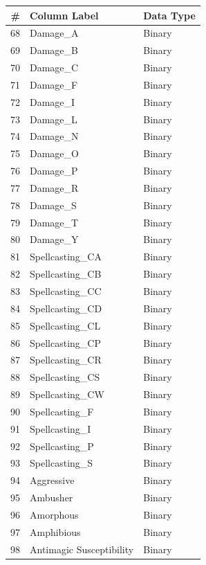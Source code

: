 \documentclass{article}
\begin{document}
\begin{table}[ht]
\begin{tiny}
\begin{minipage}[b]{0.45\linewidth}
\begin{tabular}{@{}rll@{}}
	\bottomrule
\end{tabular}
\end{minipage}
\hspace{0.5cm}
\begin{minipage}[b]{0.45\linewidth}\centering
\begin{tabular}{@{}rll@{}}
	\toprule
	\# & Column Label & Data Type \\
	\midrule
	68 & Damage\_A & Binary \\
	69 & Damage\_B & Binary \\
	70 & Damage\_C & Binary \\
	71 & Damage\_F & Binary \\
	72 & Damage\_I & Binary \\
	73 & Damage\_L & Binary \\
	74 & Damage\_N & Binary \\
	75 & Damage\_O & Binary \\
	76 & Damage\_P & Binary \\
	77 & Damage\_R & Binary \\
	78 & Damage\_S & Binary \\
	79 & Damage\_T & Binary \\
	80 & Damage\_Y & Binary \\
	81 & Spellcasting\_CA & Binary \\
	82 & Spellcasting\_CB & Binary \\
	83 & Spellcasting\_CC & Binary \\
	84 & Spellcasting\_CD & Binary \\
	85 & Spellcasting\_CL & Binary \\
	86 & Spellcasting\_CP & Binary \\
	87 & Spellcasting\_CR & Binary \\
	88 & Spellcasting\_CS & Binary \\
	89 & Spellcasting\_CW & Binary \\
	90 & Spellcasting\_F & Binary \\
	91 & Spellcasting\_I & Binary \\
	92 & Spellcasting\_P & Binary \\
	93 & Spellcasting\_S & Binary \\
	94 & Aggressive & Binary \\
	95 & Ambusher & Binary \\
	96 & Amorphous & Binary \\
	97 & Amphibious & Binary \\
	98 & Antimagic Susceptibility & Binary \\

\end{tabular}
\end{minipage}
\end{tiny}
\end{table}
\end{document}
